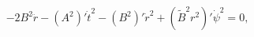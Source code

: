 \begin{equation}
-2 B^{2}\ddot{r}-(A^{2})'\dot{t}^{2}-(B^{2})'\dot{r}^{2}
+(\tilde{B}^{2}r^{2})'\dot{\psi}^{2}=0,
\end{equation}


